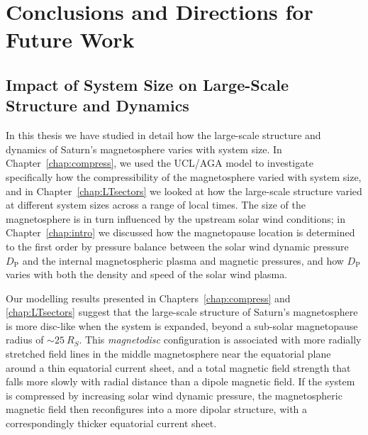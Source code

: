 \chapter{Conclusions and Directions for Future Work}
\label{chap:conclusions}
\section{Impact of System Size on Large-Scale Structure and Dynamics}
In this thesis we have studied in detail how the large-scale structure and dynamics of Saturn's magnetosphere varies with system size. In Chapter~\ref{chap:compress}, we used the UCL/AGA model to investigate specifically how the compressibility of the magnetosphere varied with system size, and in Chapter~\ref{chap:LTsectors} we looked at how the large-scale structure varied at different system sizes across a range of local times. The size of the magnetosphere is in turn influenced by the upstream solar wind conditions; in Chapter~\ref{chap:intro} we discussed how the magnetopause location is determined to the first order by pressure balance between the solar wind dynamic pressure $D_\mathrm{P}$ and the internal magnetospheric plasma and magnetic pressures, and how $D_\mathrm{P}$ varies with both the density and speed of the solar wind plasma.

Our modelling results presented in Chapters~\ref{chap:compress} and \ref{chap:LTsectors} suggest that the large-scale structure of Saturn's magnetosphere is more disc-like when the system is expanded, beyond a sub-solar magnetopause radius of ${\sim}\SI{25}{R_S}$. This \textit{magnetodisc} configuration is associated with more radially stretched field lines in the middle magnetosphere near the equatorial plane around a thin equatorial current sheet, and a total magnetic field strength that falls more slowly with radial distance than a dipole magnetic field. If the system is compressed by increasing solar wind dynamic pressure, the magnetospheric magnetic field then reconfigures into a more dipolar structure, with a correspondingly thicker equatorial current sheet. 

